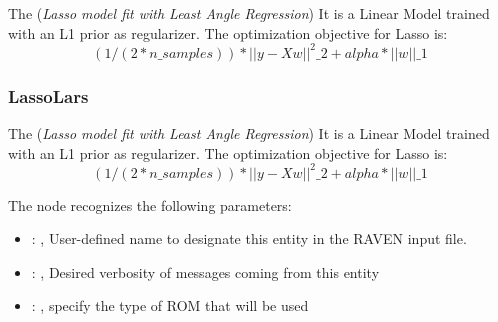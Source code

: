  The  (\textit{Lasso model fit with Least Angle Regression})
 It is a Linear Model trained with an L1 prior as regularizer.                         The
 optimization objective for Lasso is:                         \begin{equation}
 (1 / (2 * n\_samples)) * ||y - Xw||^2\_2 + alpha * ||w||\_1                         \end{equation}

\subsubsection{LassoLars}
  The  (\textit{Lasso model fit with Least Angle Regression})
  It is a Linear Model trained with an L1 prior as regularizer.                         The
  optimization objective for Lasso is:                         \begin{equation}
  (1 / (2 * n\_samples)) * ||y - Xw||^2\_2 + alpha * ||w||\_1                         \end{equation}

  The  node recognizes the following parameters:
    \begin{itemize}
      \item {}: , 
        User-defined name to designate this entity in the RAVEN input file.
      \item {}: , 
        Desired verbosity of messages coming from this entity
      \item {}: , 
        specify the type of ROM that will be used
  \end{itemize}

